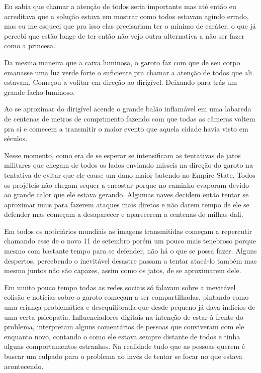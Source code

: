 Eu sabia que chamar a atenção de todos seria importante mas até então eu acreditava que a solução estava em mostrar como todos estavam agindo errado, mas eu me esqueci que pra isso elas precisariam ter o mínimo de caráter, o que já percebi que estão longe de ter então não vejo outra alternativa a não ser fazer como a princesa.

Da mesma maneira que a caixa luminosa, o garoto faz com que de seu corpo emanasse uma luz verde forte o suficiente pra chamar a atenção de todos que ali estavam. Começou a volitar em direção ao dirigível. Deixando para trás um grande facho luminoso.

Ao se aproximar do dirigível acende o grande balão inflamável em uma labareda de centenas de metros de comprimento fazendo com que todas as câmeras voltem pra si e comecem a transmitir o maior evento que aquela cidade havia visto em séculos.

Nesse momento, como era de se esperar se intensificam as tentativas de jatos militares que chegam de todos os lados enviando misseis na direção do garoto na tentativa de evitar que ele cause um dano maior batendo no Empire State. Todos os projéteis não chegam sequer a encostar porque no caminho evaporam devido ao grande calor que ele estava gerando. Algumas naves decidem então tentar se aproximar mais para fazerem ataques mais diretos e não darem tempo de ele se defender mas começam a desaparecer e aparecerem a centenas de milhas dali.

Em todos os noticiários mundiais as imagens transmitidas começam a repercutir chamando esse de o novo 11 de setembro porém um pouco mais tenebroso porque mesmo com bastante tempo para se defender, não há o que se possa fazer. Alguns despertos, percebendo o inevitável desastre passam a tentar atacá-lo também mas mesmo juntos não são capazes, assim como os jatos, de se aproximarem dele.

Em muito pouco tempo todas as redes sociais só falavam sobre a inevitável colisão e notícias sobre o garoto começam a ser compartilhadas, pintando como uma criança problemática e desequilibrada que desde pequeno já dava indícios de uma certa psicopatia. Influenciadores digitais na intenção de estar à frente do problema, interpretam alguns comentários de pessoas que conviveram com ele enquanto novo, contando o como ele estava sempre distante de todos e tinha alguns comportamentos estranhos.
Na realidade tudo que as pessoas querem é buscar um culpado para o problema ao invés de tentar se focar no que estava acontecendo.

